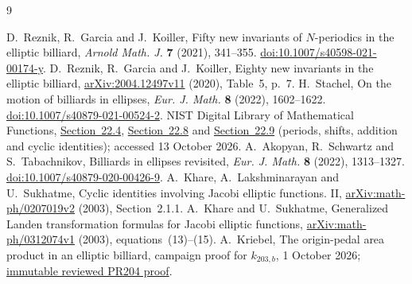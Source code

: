 \documentclass[11pt,letterpaper]{article}
\begin{document}
\begin{thebibliography}{9}
\small\raggedright
{}
D.~Reznik, R.~Garcia and J.~Koiller,
Fifty new invariants of $N$-periodics in the elliptic billiard,
\emph{Arnold Math. J.} \textbf{7} (2021), 341--355.
\href{https://doi.org/10.1007/s40598-021-00174-y}{doi:10.1007/s40598-021-00174-y}.
D.~Reznik, R.~Garcia and J.~Koiller,
Eighty new invariants in the elliptic billiard,
\href{https://arxiv.org/abs/2004.12497v11}{arXiv:2004.12497v11} (2020),
Table~5, p.~7.
H.~Stachel, On the motion of billiards in ellipses,
\emph{Eur. J. Math.} \textbf{8} (2022), 1602--1622.
\href{https://doi.org/10.1007/s40879-021-00524-2}{doi:10.1007/s40879-021-00524-2}.
NIST Digital Library of Mathematical Functions,
\href{https://dlmf.nist.gov/22.4}{Section~22.4},
\href{https://dlmf.nist.gov/22.8}{Section~22.8} and
\href{https://dlmf.nist.gov/22.9}{Section~22.9}
(periods, shifts, addition and cyclic identities); accessed 13 October 2026.
A.~Akopyan, R.~Schwartz and S.~Tabachnikov,
Billiards in ellipses revisited,
\emph{Eur. J. Math.} \textbf{8} (2022), 1313--1327.
\href{https://doi.org/10.1007/s40879-020-00426-9}{doi:10.1007/s40879-020-00426-9}.
A.~Khare, A.~Lakshminarayan and U.~Sukhatme,
Cyclic identities involving Jacobi elliptic functions. II,
\href{https://arxiv.org/abs/math-ph/0207019v2}{arXiv:math-ph/0207019v2} (2003),
Section~2.1.1.
A.~Khare and U.~Sukhatme,
Generalized Landen transformation formulas for Jacobi elliptic functions,
\href{https://arxiv.org/abs/math-ph/0312074v1}{arXiv:math-ph/0312074v1} (2003),
equations~(13)--(15).
A.~Kriebel, The origin-pedal area product in an elliptic billiard,
campaign proof for $k_{203,b}$, 1 October 2026;
\href{https://github.com/AlecKriebel/Math/blob/551a524e2db65fec90684485ef676d0b4179378d/unsolved_math_prioritization/attempts/5100012/PROOF.md}{immutable reviewed PR204 proof}.
\end{thebibliography}
\end{document}
